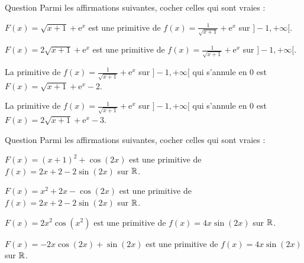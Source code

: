 \begin{multi}{Question}
Parmi les affirmations suivantes, cocher celles qui sont vraies :

    \item \(\displaystyle F(x)=\sqrt{x+1}+\mathrm{e}^{x}\) est une primitive de \(\displaystyle f(x)=\frac{1}{\sqrt{x+1}}+\mathrm{e}^{x}\) sur \(]-1,+\infty[\).
    \item* \(\displaystyle F(x)=2\sqrt{x+1}+\mathrm{e}^{x}\) est une primitive de \(\displaystyle f(x)=\frac{1}{\sqrt{x+1}}+\mathrm{e}^{x}\) sur \(]-1,+\infty[\).
    \item La primitive de \(\displaystyle f(x)=\frac{1}{\sqrt{x+1}}+\mathrm{e}^{x}\) sur \(]-1,+\infty[\) qui s'annule en \(0\) est \(\displaystyle F(x)=\sqrt{x+1}+\mathrm{e}^{x}-2\).
    \item* La primitive de \(\displaystyle f(x)=\frac{1}{\sqrt{x+1}}+\mathrm{e}^{x}\) sur \(]-1,+\infty[\) qui s'annule en \(0\) est \(\displaystyle F(x)=2\sqrt{x+1}+\mathrm{e}^{x}-3\).
\end{multi}


\begin{multi}[multiple,feedback=
{On a : \(\displaystyle \Big[(x+1)^2+\cos (2x)\Big]'=2x+2-2\sin (2x)\). Donc \(\displaystyle (x+1)^2+\cos (2x)\) est une primitive de \(\displaystyle 2x+2-2\sin (2x)\) sur \(\Rr\). De même, \(\displaystyle -2x\cos (2x)+\sin (2x)\) est une primitive de \(\displaystyle 4x\sin (2x)\) sur \(\Rr\).
}]{Question}
Parmi les affirmations suivantes, cocher celles qui sont vraies :

    \item* \(\displaystyle F(x)=(x+1)^2+\cos (2x)\) est une primitive de \(\displaystyle f(x)=2x+2-2\sin (2x)\) sur \(\Rr\).
    \item \(\displaystyle F(x)=x^2+2x-\cos (2x)\) est une primitive de \(\displaystyle f(x)=2x+2-2\sin (2x)\) sur \(\Rr\).
    \item \(\displaystyle F(x)=2x^2\cos (x^2)\) est une primitive de \(\displaystyle f(x)=4x\sin (2x)\) sur \(\Rr\).
    \item* \(\displaystyle F(x)=-2x\cos (2x)+\sin (2x)\) est une primitive de \(\displaystyle f(x)=4x\sin (2x)\) sur \(\Rr\).
\end{multi}


